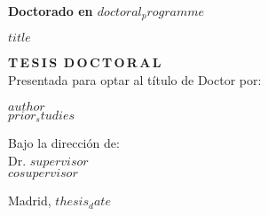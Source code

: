 \vspace{15 mm}

\begin{center}
\begin{spacing}{1.5}
\textbf{\large {Doctorado en {$doctoral_programme$}}}\\
\end{spacing}
\vspace{10 mm}

\begin{spacing}{2.0}
\textbf{\LARGE {$title$}}
\end{spacing}

\vspace{15 mm}

\begin{spacing}{1.3}
\textbf{\LARGE {T\,E\,S\,I\,S\, D\,O\,C\,T\,O\,R\,A\,L}}\\
\medskip
{\large {Presentada para optar al título de Doctor por:}}
\end{spacing}
\end{center}


\begin{center}
\begin{spacing}{1.3}
\textbf{\Large {$author$}}\\
{\large {$prior_studies$}}\\
\end{spacing}
\end{center}

\vspace{5 mm}
\begin{center}
\begin{spacing}{1.3}
{Bajo la dirección de:}\\
    {\large {Dr. $supervisor$}}\\
    {\large {$cosupervisor$}}
\end{spacing}
\end{center}

\vspace{\fill}
\begin{center}
    \large {Madrid, $thesis_date$}
\end{center}

\newpage
